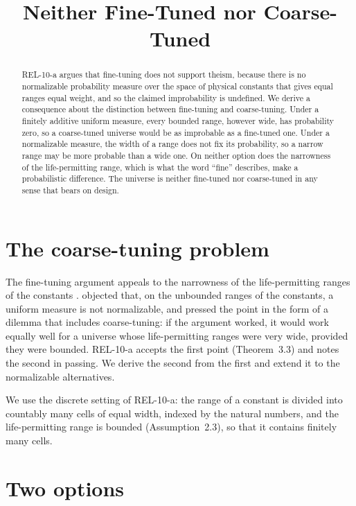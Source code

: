 \documentclass{situationist-preprint}
\title{Neither Fine-Tuned nor Coarse-Tuned}
\begin{document}
\maketitle

\begin{abstract}
REL-10-a argues that fine-tuning does not support theism, because there is no normalizable probability measure over the space of physical constants that gives equal ranges equal weight, and so the claimed improbability is undefined. We derive a consequence about the distinction between fine-tuning and coarse-tuning. Under a finitely additive uniform measure, every bounded range, however wide, has probability zero, so a coarse-tuned universe would be as improbable as a fine-tuned one. Under a normalizable measure, the width of a range does not fix its probability, so a narrow range may be more probable than a wide one. On neither option does the narrowness of the life-permitting range, which is what the word \enquote{fine} describes, make a probabilistic difference. The universe is neither fine-tuned nor coarse-tuned in any sense that bears on design.
\end{abstract}

\section{The coarse-tuning problem}

The fine-tuning argument appeals to the narrowness of the life-permitting ranges of the constants \citep{Collins2009}. \citet{McGrewMcGrewVestrup2001} objected that, on the unbounded ranges of the constants, a uniform measure is not normalizable, and \citet{ColyvanGarfieldPriest2005} pressed the point in the form of a dilemma that includes coarse-tuning: if the argument worked, it would work equally well for a universe whose life-permitting ranges were very wide, provided they were bounded. REL-10-a accepts the first point (Theorem~3.3) and notes the second in passing. We derive the second from the first and extend it to the normalizable alternatives.

We use the discrete setting of REL-10-a: the range of a constant is divided into countably many cells of equal width, indexed by the natural numbers, and the life-permitting range is bounded (Assumption~2.3), so that it contains finitely many cells.

\section{Two options}
\end{document}
